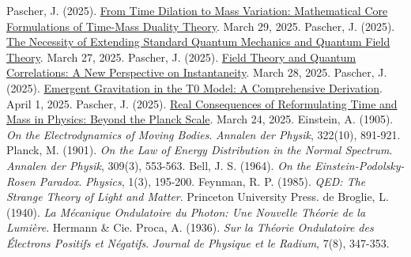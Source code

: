\documentclass[12pt,a4paper]{article}
\begin{document}
\begin{thebibliography}{99}
		 Pascher, J. (2025). \href{https://github.com/jpascher/T0-Time-Mass-Duality/tree/main/2/pdf/English/MathZeitMasseLagrangeEn.pdf}{From Time Dilation to Mass Variation: Mathematical Core Formulations of Time-Mass Duality Theory}. March 29, 2025.
		 Pascher, J. (2025). \href{https://github.com/jpascher/T0-Time-Mass-Duality/tree/main/2/pdf/English/NotwendigkeitQMErweiterungEn.pdf}{The Necessity of Extending Standard Quantum Mechanics and Quantum Field Theory}. March 27, 2025.
		 Pascher, J. (2025). \href{https://github.com/jpascher/T0-Time-Mass-Duality/tree/main/2/pdf/English/FeldtheorieQuantenEn.pdf}{Field Theory and Quantum Correlations: A New Perspective on Instantaneity}. March 28, 2025.
		 Pascher, J. (2025). \href{https://github.com/jpascher/T0-Time-Mass-Duality/tree/main/2/pdf/English/EmergentGravT0En.pdf}{Emergent Gravitation in the T0 Model: A Comprehensive Derivation}. April 1, 2025.
		 Pascher, J. (2025). \href{https://github.com/jpascher/T0-Time-Mass-Duality/tree/main/2/pdf/English/JenseitsPlanckEn.pdf}{Real Consequences of Reformulating Time and Mass in Physics: Beyond the Planck Scale}. March 24, 2025.
		 Einstein, A. (1905). \textit{On the Electrodynamics of Moving Bodies}. \textit{Annalen der Physik}, 322(10), 891-921.
		 Planck, M. (1901). \textit{On the Law of Energy Distribution in the Normal Spectrum}. \textit{Annalen der Physik}, 309(3), 553-563.
		 Bell, J. S. (1964). \textit{On the Einstein-Podolsky-Rosen Paradox}. \textit{Physics}, 1(3), 195-200.
		 Feynman, R. P. (1985). \textit{QED: The Strange Theory of Light and Matter}. Princeton University Press.
		 de Broglie, L. (1940). \textit{La Mécanique Ondulatoire du Photon: Une Nouvelle Théorie de la Lumière}. Hermann \& Cie.
		 Proca, A. (1936). \textit{Sur la Théorie Ondulatoire des Électrons Positifs et Négatifs}. \textit{Journal de Physique et le Radium}, 7(8), 347-353.
	\end{thebibliography}
	
\end{document}
